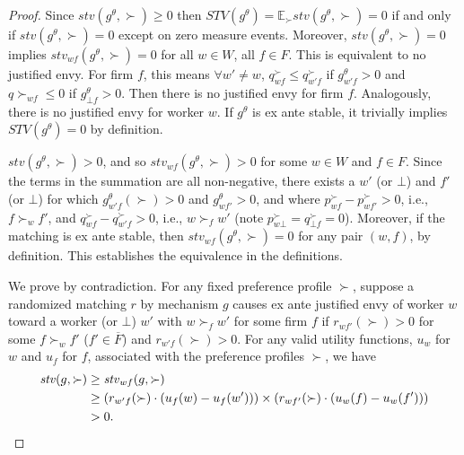 \documentclass[11pt,letterpaper]{article}
\theoremstyle{definition}
\newcommand{\kibitz}[2]{\ifnum\Comments=1{\color{#1}{#2}}\fi}
\newcommand{\dcp}[1]{\kibitz{orange}{[DCP: #1]}}
\begin{document}
\begin{proof}
Since $\mathit{stv}(g^\theta, \succ)\geq 0$ then $\mathit{STV}(g^\theta)=\mathbb{E}_{\succ} \mathit{stv}(g^\theta,\succ)=0$ if and only if 
$\mathit{stv}(g^\theta, \succ)= 0$ except on zero measure events. 
Moreover, $\mathit{stv}(g^\theta, \succ)= 0$ implies $\mathit{stv}_{wf}(g^\theta,\succ)=0$ for all $w\in W$, all $f\in F$.  This is equivalent to no justified envy.
%
For firm $f$, this means $\forall w'\neq w$, $q^\succ_{wf} \leq  q^\succ_{w'f}$ if $g^\theta_{w'f} > 0$ and $q\succ_{wf} \leq 0$ if $g^\theta_{\bot f} > 0$. Then there is no justified envy for firm $f$. Analogously, there is no justified envy for worker $w$. If $g^\theta$ is ex ante stable, it trivially implies $STV(g^\theta)=0$ by definition.
%

$\mathit{stv}(g^\theta,\succ)>0$, and so $\mathit{stv}_{wf}(g^\theta,\succ)>0$ for some $w\in W$ and $f\in F$. Since the terms in the summation are all non-negative, there exists a $w'$ (or $\bot$) and $f'$ (or $\bot$) for which $g^\theta_{w'f}(\succ)>0$ and $g^\theta_{wf'}>0$, and where $p^\succ_{wf}-p^\succ_{wf'}>0$, i.e., $f \succ_w f'$, and $q^\succ_{wf}-q^\succ_{w'f}>0$, i.e., $w \succ_f w'$ (note $p^\succ_{w\bot} = q^\succ_{\bot f}=0$). Moreover, if the matching is ex ante stable, then $\mathit{stv}_{wf}(g^\theta, \succ) = 0$ for any pair $(w, f)$, by  definition. This establishes the equivalence in the definitions.

\fi
%

We prove by contradiction. For any fixed preference profile $\succ$, suppose a randomized matching $r$ by mechanism $g$ causes ex ante justified envy of worker $w$ toward a worker (or $\bot$) $w'$ with $w \succ_f w'$ for some firm $f$ if $r_{wf'}(\succ) > 0$ for some $f \succ_w f'$ ($f'\in \overline{F}$) and $r_{w'f}(\succ) > 0$. For any valid utility functions, $u_w$ for $w$ and $u_f$ for $f$, %
associated with the preference profiles $\succ$, we have
\begin{align*}
\mathit{stv}(g, \succ) &\geq \mathit{stv}_{wf}(g, \succ) \notag \\&\geq \left(r_{w'f}(\succ) \cdot (u_f(w) - u_{f}(w'))\right)  \times \left(r_{wf'}(\succ)\cdot(u_{w}(f) - u_{w}(f')) \right) \notag \\ &> 0.
\end{align*}
\fi
\end{proof}
\end{document}
